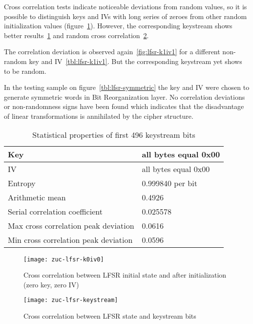 Cross correlation tests indicate noticeable deviations from random values, so
it is possible to distinguish keys and IVs with long series of zeroes from
other random initialization values (figure~\ref{fig:lfsr-k0iv0}). However, the corresponding
keystream shows better results~\ref{tbl:keystream-k0iv0} and random cross
correlation~\ref{fig:keystream-k0iv0}.

The correlation deviation is observed again~\ref{fig:lfsr-k1iv1} for a different non-random
key and IV~\ref{tbl:lfsr-k1iv1}. But the corresponding keystream yet shows to be random.

In the testing sample on figure~\ref{tbl:lfsr-symmetric} the key and IV were chosen to
generate symmetric words in Bit Reorganization layer. No correlation deviations
or non-randomness signs have been found which indicates that the disadvantage
of linear transformations is annihilated by the cipher structure.

\begin{table}[htbp]
    \centering
    \caption{Statistical properties of first 496 keystream bits}
    \label{tbl:keystream-k0iv0}
    \begin{tabular}{|l|l|} \hline
        Key     & all bytes equal 0x00  \\ \hline
        IV      & all bytes equal 0x00  \\ \hline
        Entropy & 0.999840 per bit      \\ \hline
        Arithmetic mean & 0.4926        \\ \hline
        Serial correlation coefficient          & 0.025578  \\ \hline
        Max cross correlation peak deviation    & 0.0616    \\ \hline
        Min cross correlation peak deviation    & 0.0596    \\ \hline
    \end{tabular}
\end{table}

\begin{figure}[htbp]
	\centering
	\texttt{[image: zuc-lfsr-k0iv0]}
	\caption{Cross correlation between LFSR initial state and after
    initialization (zero key, zero IV)}
	\label{fig:lfsr-k0iv0}
\end{figure}

\begin{figure}[htbp]
	\centering
	\texttt{[image: zuc-lfsr-keystream]}
	\caption{Cross correlation between LFSR state and keystream bits}
	\label{fig:keystream-k0iv0}
\end{figure}

